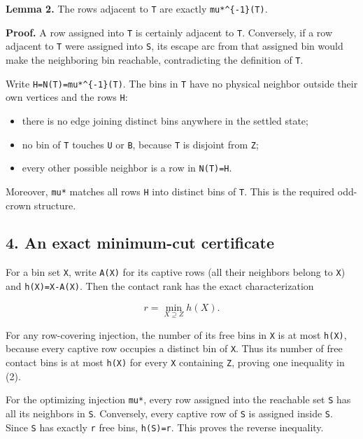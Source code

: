 \textbf{Lemma 2.} The rows adjacent to \texttt{T} are exactly \texttt{mu*\^{}\{-1\}(T)}.

\textbf{Proof.} A row assigned into \texttt{T} is certainly adjacent to \texttt{T}. Conversely, if a row adjacent to \texttt{T} were assigned into \texttt{S}, its escape arc from that assigned bin would make the neighboring bin reachable, contradicting the definition of \texttt{T}.

Write \texttt{H=N(T)=mu*\^{}\{-1\}(T)}. The bins in \texttt{T} have no physical neighbor outside their own vertices and the rows \texttt{H}:

\begin{itemize}
\tightlist
\item
  there is no edge joining distinct bins anywhere in the settled state;
\item
  no bin of \texttt{T} touches \texttt{U} or \texttt{B}, because \texttt{T} is disjoint from \texttt{Z};
\item
  every other possible neighbor is a row in \texttt{N(T)=H}.
\end{itemize}

Moreover, \texttt{mu*} matches all rows \texttt{H} into distinct bins of \texttt{T}. This is the required odd-crown structure.

\hypertarget{af-f687f276ee-an-exact-minimum-cut-certificate}{%
\subsection{4. An exact minimum-cut certificate}\label{af-f687f276ee-an-exact-minimum-cut-certificate}}

For a bin set \texttt{X}, write \texttt{A(X)} for its captive rows (all their neighbors belong to \texttt{X}) and \texttt{h(X)=\textbar{}X\textbar{}-\textbar{}A(X)\textbar{}}. Then the contact rank has the exact characterization

\[
r=\min_{X\supseteq Z}h(X).\tag{2}
\]

For any row-covering injection, the number of its free bins in \texttt{X} is at most \texttt{h(X)}, because every captive row occupies a distinct bin of \texttt{X}. Thus its number of free contact bins is at most \texttt{h(X)} for every \texttt{X} containing \texttt{Z}, proving one inequality in (2).

For the optimizing injection \texttt{mu*}, every row assigned into the reachable set \texttt{S} has all its neighbors in \texttt{S}. Conversely, every captive row of \texttt{S} is assigned inside \texttt{S}. Since \texttt{S} has exactly \texttt{r} free bins, \texttt{h(S)=r}. This proves the reverse inequality.

